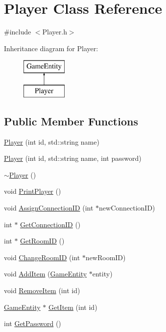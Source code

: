 \hypertarget{class_player}{}\section{Player Class Reference}
\label{class_player}


{\ttfamily \#include $<$Player.\+h$>$}

Inheritance diagram for Player\+:\begin{figure}[H]
\begin{center}
\leavevmode
\includegraphics[height=2.000000cm]{class_player}
\end{center}
\end{figure}
\subsection*{Public Member Functions}
\begin{DoxyCompactItemize}
\item 
\hyperlink{class_player_a52b1205956ebebdf8fb8ed36cb96bb38}{Player} (int id, std\+::string name)
\item 
\hyperlink{class_player_a6b11a80e6a2fe00708bc7228c07e64bd}{Player} (int id, std\+::string name, int password)
\item 
\hyperlink{class_player_a749d2c00e1fe0f5c2746f7505a58c062}{$\sim$\+Player} ()
\item 
void \hyperlink{class_player_a3b6ec90fba692a26dd0b7a1152fdd81b}{Print\+Player} ()
\item 
void \hyperlink{class_player_ac053e1c2dc6f58dcb56549b55f84eefc}{Assign\+Connection\+I\+D} (int $\ast$new\+Connection\+I\+D)
\item 
int $\ast$ \hyperlink{class_player_aa8babf0a2414f0b1c8f3c869884ee1fb}{Get\+Connection\+I\+D} ()
\item 
int $\ast$ \hyperlink{class_player_accc15d0a218d831646ab120d0c3422ec}{Get\+Room\+I\+D} ()
\item 
void \hyperlink{class_player_af783946de60e739b40264e0dee2cf3fc}{Change\+Room\+I\+D} (int $\ast$new\+Room\+I\+D)
\item 
void \hyperlink{class_player_a8c3a7fe4d77f39dca16d9d1b820bd5b3}{Add\+Item} (\hyperlink{class_game_entity}{Game\+Entity} $\ast$entity)
\item 
void \hyperlink{class_player_aff31ee6916b9fbfeafeb6f6011a0818e}{Remove\+Item} (int id)
\item 
\hyperlink{class_game_entity}{Game\+Entity} $\ast$ \hyperlink{class_player_a503d12d7f5db24c19d53fa3db586ab54}{Get\+Item} (int id)
\item 
int \hyperlink{class_player_a69905a1f6b3e303f9faefc6158a14e55}{Get\+Password} ()
\end{DoxyCompactItemize}


